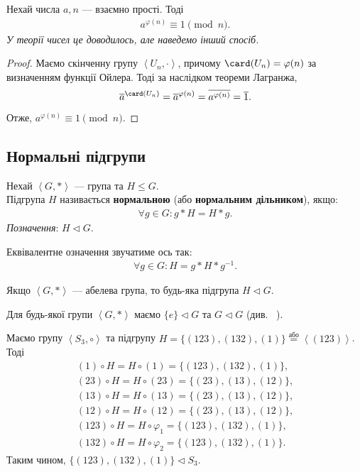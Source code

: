 \documentclass{math_library}
\begin{document}
\begin{theorem}
Нехай числа $a,n$ --- взаємно прості. Тоді
\begin{align*}
a^{\varphi(n)} \equiv 1 \pmod n.
\end{align*}
\textit{У теорії чисел це доводилось, але наведемо інший спосіб.}
\end{theorem}

\begin{proof}
Маємо скінченну групу $\left<U_n,\cdot\right>$, причому $\card(U_n) = \varphi(n)$ за визначенням функції Ойлера. Тоді за наслідком теореми Лагранжа, 
\[
\overline{a}^{\card(U_n)} = \overline{a}^{\varphi(n)} = \overline{a^{\varphi(n)}} = \overline{1}.
\]
Отже, $a^{\varphi(n)} \equiv 1 \pmod n$.
\end{proof}

\subsection{Нормальні підгрупи}
\begin{definition}
Нехай $\left<G,* \right>$ --- група та $H \leq G$.\\
Підгрупа $H$ називається \textbf{нормальною} (або \textbf{нормальним дільником}), якщо:
\begin{align*}
\forall g \in G: g*H = H*g.
\end{align*}
\textit{Позначення}: $H \triangleleft G$.
\end{definition}

\begin{remark}
Еквівалентне означення звучатиме ось так:
\begin{align*}
\forall g \in G: H = g*H*g^{-1}.
\end{align*}
\end{remark}

\begin{example}
Якщо $\left<G,* \right>$ --- абелева група, то будь-яка підгрупа $H \triangleleft G$.
\end{example}

\begin{example}
Для будь-якої групи $\left<G,*\right>$ маємо $\{e\} \triangleleft G$ та $G \triangleleft G$ (див.~ ).
\end{example}

\begin{example}
Маємо групу $\left<S_3, \circ \right>$ та підгрупу $H = \{(123),(132),(1)\} \overset{\text{або}}{=} \left<(123)\right>$. Тоді
\begin{align*}
(1) \circ H = H \circ (1) = \{(123),(132),(1)\}, \\
(23) \circ H = H \circ (23) = \{(23),(13),(12)\}, \\
(13) \circ H = H \circ (13) = \{(23),(13),(12)\}, \\
(12) \circ H = H \circ (12) = \{(23),(13),(12)\}, \\
(123) \circ H = H \circ \varphi_1 = \{(123),(132),(1)\}, \\
(132) \circ H = H \circ \varphi_2 = \{(123),(132),(1)\}.
\end{align*}
Таким чином, $\{(123),(132),(1)\} \triangleleft S_3$.
\end{example}
\end{document}
